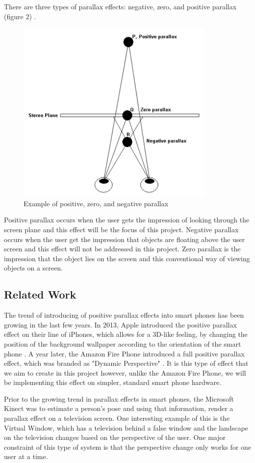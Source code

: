 \documentclass[12pt,twocolumn,letterpaper]{article}
\begin{document}
There are three types of parallax effects: negative, zero, and positive parallax (figure 2) \cite{CSU}.  

\begin{figure}[!htbp]
\centering
\includegraphics[height=35 mm]{images/NegPosParallax.png}
\caption{Example of positive, zero, and negative parallax}
\end{figure}

Positive parallax occurs when the user gets the impression of looking through the screen plane and this effect will be the focus of this project.  Negative parallax occurs when the user get the impression that objects are floating above the user screen and this effect will not be addressed in this project.  Zero parallax is the impression that the object lies on the screen and this conventional way of viewing objects on a screen.

\subsection{Related Work}
The trend of introducing of positive parallax effects into smart phones has been growing in the last few years.  In 2013, Apple introduced the positive parallax effect on their line of iPhones, which allows for a 3D-like feeling, by changing the position of the background wallpaper according to the orientation of the smart phone \cite{BusinessInsider}.  A year later, the Amazon Fire Phone introduced a full positive parallax effect, which was branded as "Dynamic Perspective" \cite{DigitalTrends}.  It is this type of effect that we aim to create in this project however, unlike the Amazon Fire Phone, we will be implementing this effect on simpler, standard smart phone hardware.

Prior to the growing trend in parallax effects in smart phones, the Microsoft Kinect was to estimate a person's pose and using that information, render a parallax effect on a television screen.  One interesting example of this is the Virtual Window, which has a television behind a false window and the landscape on the television changes based on the perspective of the user.  One major constraint of this type of system is that the perspective change only works for one user at a time.
\end{document}
